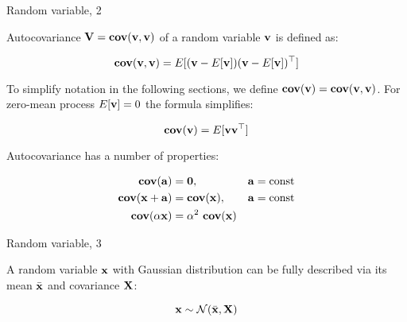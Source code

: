 \documentclass{beamer}
\begin{document}
\begin{frame}{Random variable, 2}
	\begin{flushleft}
		
		Autocovariance $\mathbf{V} = \textbf{cov}(\mathbf{v}, \mathbf{v})$ of a random variable $\mathbf{v}$ is defined as:
		
		\begin{equation}
			\textbf{cov}(\mathbf{v}, \mathbf{v}) = E[(\mathbf{v} - E[\mathbf{v}])(\mathbf{v} - E[\mathbf{v}])^\top]
		\end{equation}
	
		To simplify notation in the following sections, we define $\textbf{cov}(\mathbf{v}) = \textbf{cov}(\mathbf{v}, \mathbf{v})$. For zero-mean process $E[\mathbf{v}] = 0$ the formula simplifies:
		
		\begin{equation}
			\textbf{cov}(\mathbf{v}) = E[\mathbf{v}\mathbf{v}^\top]
		\end{equation}
		
		Autocovariance has a number of properties:
		
		\begin{align}
			\textbf{cov}(\bo{a}) &= \bo{0}, & \bo{a}= \text{const} 
			\\
			\textbf{cov}(\bo{x}+\bo{a}) &= \textbf{cov}(\bo{x}), & \bo{a}= \text{const} 
			\\
			\textbf{cov}(\alpha \bo{x}) &= \alpha^2 \ \textbf{cov}(\bo{x}) &
		\end{align}
		
		
		
	\end{flushleft}
\end{frame}




\begin{frame}{Random variable, 3}
	\begin{flushleft}
		
		A random variable $\mathbf{x}$ with Gaussian distribution can be fully described via its mean $\bar{\mathbf{x}}$ and covariance $\mathbf{X}$:
		
		\begin{equation}
			\mathbf{x} \sim \mathcal{N} (\bar{\mathbf{x}}, \mathbf{X})
		\end{equation}
	
		
	\end{flushleft}
\end{frame}
\end{document}
